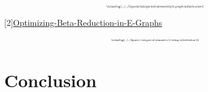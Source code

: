 \documentclass[aspectratio=169]{beamer}
\begin{document}
\begin{frame}
    \[
        \scalebox{0.4}{
        \tikzfig{../../figures/categorical-semantics/e-graph-substitution}
        }
    \]
    \tiny{[2]\href{https://pldi23.sigplan.org/details/egraphs-2023-papers/12/Optimizing-Beta-Reduction-in-E-Graphs}{Optimizing-Beta-Reduction-in-E-Graphs}}
    \[
        \scalebox{0.35}{
        \tikzfig{../../figures/categorical-semantics/e-string-substitution-2}
        }
    \]
\end{frame}

\section{Conclusion}
\end{document}
